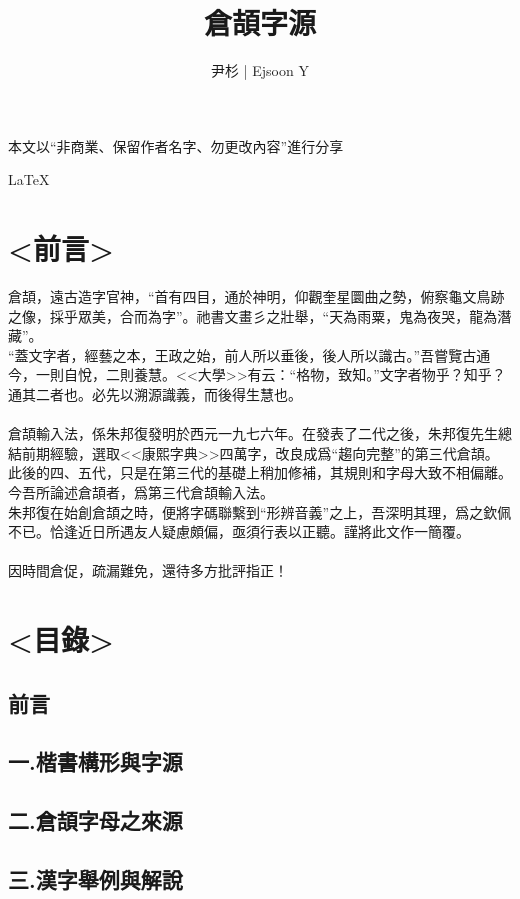 \documentclass{article}
\title{倉頡字源}
\author{尹杉 | Ejsoon Y}
\date{} %
\begin{document}
\maketitle 
本文以“非商業、保留作者名字、勿更改內容”進行分享


\LaTeX\


\section{<前言>}

倉頡，遠古造字官神，“首有四目，通於神明，仰觀奎星圜曲之勢，俯察龜文鳥跡之像，採乎眾美，合而為字”。祂書文畫彡之壯舉，“天為雨粟，鬼為夜哭，龍為潛藏”。\\
“蓋文字者，經藝之本，王政之始，前人所以垂後，後人所以識古。”吾嘗覽古通今，一則自悅，二則養慧。<<大學>>有云：“格物，致知。”文字者物乎？知乎？通其二者也。必先以溯源識義，而後得生慧也。\\
\\
倉頡輸入法，係朱邦復發明於西元一九七六年。在發表了二代之後，朱邦復先生總結前期經驗，選取<<康熙字典>>四萬字，改良成爲“趨向完整”的第三代倉頡。此後的四、五代，只是在第三代的基礎上稍加修補，其規則和字母大致不相偏離。今吾所論述倉頡者，爲第三代倉頡輸入法。\\
朱邦復在始創倉頡之時，便將字碼聯繫到“形辨音義”之上，吾深明其理，爲之欽佩不已。恰逢近日所遇友人疑慮頗偏，亟須行表以正聽。謹將此文作一簡覆。\\
\\
因時間倉促，疏漏難免，還待多方批評指正！\\



\section{<目錄>}

\subsection{前言}
\subsection{一.楷書構形與字源}
\subsection{二.倉頡字母之來源}
\subsection{三.漢字舉例與解說}
\end{document}
